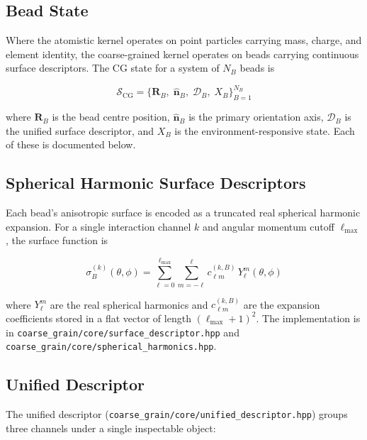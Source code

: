 ﻿\documentclass[11pt]{article}
\newcommand{\file}[1]{\texttt{#1}}
\begin{document}
\subsection{Bead State}

Where the atomistic kernel operates on point particles carrying mass, charge,
and element identity, the coarse-grained kernel operates on beads carrying
continuous surface descriptors. The CG state for a system of $N_B$ beads is

\begin{equation}
\label{eq:bead-state}
  \mathcal{S}_{\mathrm{CG}} = \bigl\{
    \mathbf{R}_B,\; \hat{\mathbf{n}}_B,\; \mathcal{D}_B,\; X_B
  \bigr\}_{B=1}^{N_B}
\end{equation}

where $\mathbf{R}_B$ is the bead centre position, $\hat{\mathbf{n}}_B$ is the
primary orientation axis, $\mathcal{D}_B$ is the unified surface descriptor,
and $X_B$ is the environment-responsive state. Each of these is documented
below.

\subsection{Spherical Harmonic Surface Descriptors}

Each bead's anisotropic surface is encoded as a truncated real spherical
harmonic expansion. For a single interaction channel $k$ and angular momentum
cutoff $\ell_{\max}$, the surface function is

\begin{equation}
\label{eq:sh-coeffs}
  \sigma_B^{(k)}(\theta, \phi)
    = \sum_{\ell=0}^{\ell_{\max}} \sum_{m=-\ell}^{\ell}
      c_{\ell m}^{(k,B)} \, Y_\ell^m(\theta, \phi)
\end{equation}

where $Y_\ell^m$ are the real spherical harmonics and $c_{\ell m}^{(k,B)}$
are the expansion coefficients stored in a flat vector of length
$(\ell_{\max}+1)^2$. The implementation is in
\file{coarse\_grain/core/surface\_descriptor.hpp} and
\file{coarse\_grain/core/spherical\_harmonics.hpp}.

\subsection{Unified Descriptor}

The unified descriptor (\file{coarse\_grain/core/unified\_descriptor.hpp})
groups three channels under a single inspectable object:
\end{document}
